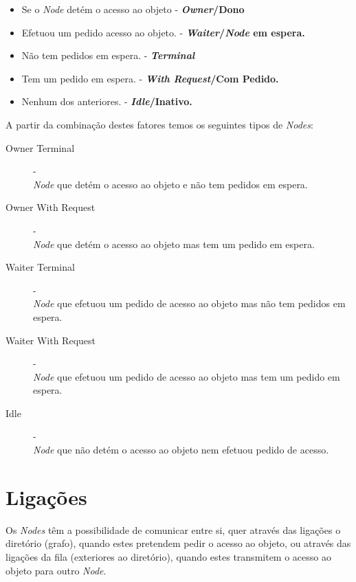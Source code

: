 \begin{itemize}
    \item Se o \emph{Node} detém o acesso ao objeto - \textbf{\emph{Owner}/Dono}
    \item Efetuou um pedido acesso ao objeto. - \textbf{\emph{Waiter}/\emph{Node} em espera. }

    \item Não tem pedidos em espera. - \textbf{\emph{Terminal}}
    \item Tem um pedido em espera. - \textbf{\emph{With Request}/Com Pedido.}

    \item Nenhum dos anteriores. - \textbf{\emph{Idle}/Inativo.}
\end{itemize}


A partir da combinação destes fatores temos os seguintes tipos de \emph{Nodes}:

\begin{description}
    \item [Owner Terminal] - \\ \emph{Node} que detém o acesso ao objeto e não tem pedidos em espera.
    \item [Owner With Request] - \\ \emph{Node} que detém o acesso ao objeto mas tem um pedido em espera.
    \item [Waiter Terminal] - \\ \emph{Node} que efetuou um pedido de acesso ao objeto mas não tem pedidos em espera.
    \item [Waiter With Request] - \\ \emph{Node} que efetuou um pedido de acesso ao objeto mas tem um pedido em espera.
    \item [Idle] - \\ \emph{Node} que não detém o acesso ao objeto nem efetuou pedido de acesso.
\end{description}



\section{Ligações}
\label{especificacao:sec:ligacoes}

Os \emph{Nodes} têm a possibilidade de comunicar entre si, quer através das ligações o diretório (grafo), quando estes pretendem pedir o acesso ao objeto, ou através das ligações da fila (exteriores ao diretório), quando estes transmitem o acesso ao objeto para outro \emph{Node}.

